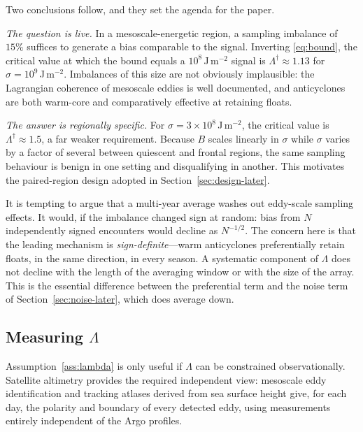 Two conclusions follow, and they set the agenda for the paper.

\emph{The question is live.} In a mesoscale-energetic region, a sampling imbalance of $15\%$
suffices to generate a bias comparable to the signal. Inverting \eqref{eq:bound}, the critical
value at which the bound equals a $10^{8}$\,J\,m$^{-2}$ signal is $\Lambda^\dagger \approx
1.13$ for $\sigma = 10^{9}$\,J\,m$^{-2}$. Imbalances of this size are not obviously
implausible: the Lagrangian coherence of mesoscale eddies is well documented, and anticyclones
are both warm-core and comparatively effective at retaining floats.

\emph{The answer is regionally specific.} For $\sigma = 3\times10^{8}$\,J\,m$^{-2}$, the
critical value is $\Lambda^\dagger \approx 1.5$, a far weaker requirement. Because $B$ scales
linearly in $\sigma$ while $\sigma$ varies by a factor of several between quiescent and
frontal regions, the same sampling behaviour is benign in one setting and disqualifying in
another. This motivates the paired-region design adopted in
Section~\ref{sec:design-later}.

\begin{remark}
\label{rem:no-averaging}
It is tempting to argue that a multi-year average washes out eddy-scale sampling effects. It
would, if the imbalance changed sign at random: bias from $N$ independently signed encounters
would decline as $N^{-1/2}$. The concern here is that the leading mechanism is
\emph{sign-definite}---warm anticyclones preferentially retain floats, in the same direction,
in every season. A systematic component of $\Lambda$ does not decline with the length of the
averaging window or with the size of the array. This is the essential difference between the
preferential term and the noise term of Section~\ref{sec:noise-later}, which does average
down.
\end{remark}

\subsection{Measuring $\Lambda$}
\label{sec:measuring}

Assumption~\ref{ass:lambda} is only useful if $\Lambda$ can be constrained observationally.
Satellite altimetry provides the required independent view: mesoscale eddy identification and
tracking atlases derived from sea surface height \citep{chelton2011} give, for each day, the
polarity and boundary of every detected eddy, using measurements entirely independent of the
Argo profiles.

